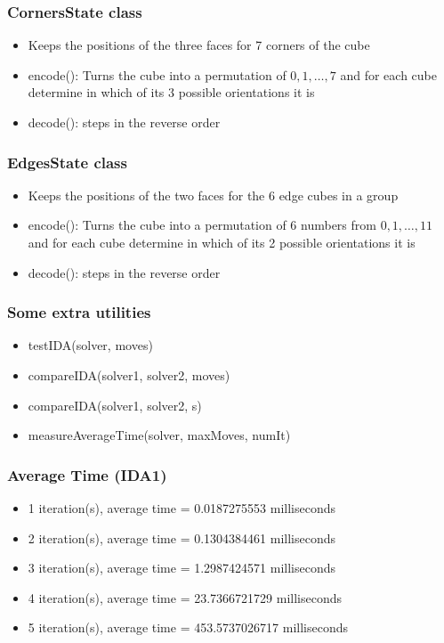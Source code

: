 \documentclass{beamer}
\begin{document}
\begin{frame}
\frametitle{CornersState class}

\begin{itemize}
\item
Keeps the positions of the three faces for 7 corners of the cube
\item
encode(): Turns the cube into a permutation of $0,1,\ldots,7$ and for each cube determine in which of its 3 possible orientations it is
\item
decode(): steps in the reverse order
\end{itemize}
\end{frame}

\begin{frame}
\frametitle{EdgesState class}

\begin{itemize}
\item
Keeps the positions of the two faces for the 6 edge cubes in a group
\item
encode(): Turns the cube into a permutation of 6 numbers from $0,1,\ldots,11$ and for each cube determine in which of its 2 possible orientations it is
\item
decode(): steps in the reverse order
\end{itemize}
\end{frame}

\begin{frame}
\frametitle{Some extra utilities}

\begin{itemize}
\item
testIDA(solver, moves)
\item
compareIDA(solver1, solver2, moves)
\item
compareIDA(solver1, solver2, s)
\item
measureAverageTime(solver, maxMoves, numIt)
\end{itemize}
\end{frame}

\begin{frame}
\frametitle{Average Time (IDA1)}

\begin{itemize}
\item
1 iteration(s), average time = 0.0187275553 milliseconds
\item
2 iteration(s), average time = 0.1304384461 milliseconds
\item
3 iteration(s), average time = 1.2987424571 milliseconds
\item
4 iteration(s), average time = 23.7366721729 milliseconds
\item
5 iteration(s), average time = 453.5737026717 milliseconds
\end{itemize}
\end{frame}
\end{document}
